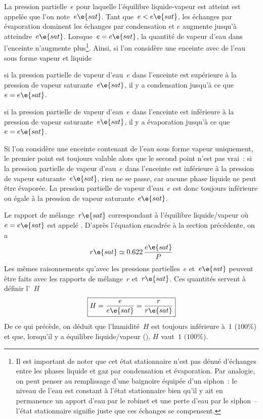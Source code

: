 \sk
La pression partielle~$e$ pour laquelle l'équilibre liquide-vapeur est atteint est appelée  que l'on note~$e\e{sat}$. Tant que~$e<e\e{sat}$, les échanges par évaporation dominent les échanges par condensation et $e$ augmente jusqu'à atteindre~$e\e{sat}$. Lorsque~$e=e\e{sat}$, la quantité de vapeur d'eau dans l'enceinte n'augmente plus\footnote{Il est important de noter que cet état stationnaire n'est pas dénué d'échanges entre les phases liquide et gaz par condensation et évaporation. Par analogie, on peut penser au remplissage d'une baignoire équipée d'un siphon~: le niveau de l'eau est constant à l'état stationnaire bien qu'il y ait en permanence un apport d'eau par le robinet et une perte d'eau par le siphon -- l'état stationnaire signifie juste que ces échanges se compensent.}. Ainsi, si l'on considère une enceinte avec de l'eau sous forme vapeur et liquide
\begin{citemize}
\item si la pression partielle de vapeur d'eau~$e$ dans l'enceinte est supérieure à la pression de vapeur saturante~$e\e{sat}$, il y a condensation jusqu'à ce que~$e=e\e{sat}$.
\item si la pression partielle de vapeur d'eau~$e$ dans l'enceinte est inférieure à la pression de vapeur saturante~$e\e{sat}$, il y a évaporation jusqu'à ce que~$e=e\e{sat}$.
\end{citemize}
Si l'on considère une enceinte contenant de l'eau sous forme vapeur uniquement, le premier point est toujours valable alors que le second point n'est pas vrai~: si la pression partielle de vapeur d'eau~$e$ dans l'enceinte est inférieure à la pression de vapeur saturante~$e\e{sat}$, rien ne se passe, car aucune phase liquide ne peut être évaporée. La pression partielle de vapeur d'eau~$e$ est donc toujours inférieure ou égale à la pression de vapeur saturante~$e\e{sat}$. 

\sk
Le rapport de mélange~$r\e{sat}$ correspondant à l'équilibre liquide/vapeur où $e=e\e{sat}$ est appelé . D'après l'équation encadrée à la section précédente, on a 
\[ r\e{sat} \simeq 0.622 \, \frac{e\e{sat}}{P} \]
Les mêmes raisonnements qu'avec les pressions partielles~$e$ et~$e\e{sat}$ peuvent être faits avec les rapports de mélange~$r$ et~$r\e{sat}$. Ces quantités servent à définir l'~$H$
\[ \boxed{ H = \frac{e}{e\e{sat}} = \frac{r}{r\e{sat}} } \]
De ce qui précède, on déduit que l'humidité~$H$ est toujours inférieure à~$1$ ($100\%$) et que, lorsqu'il y a équilibre liquide/vapeur (), $H$ vaut~$1$ ($100\%$).

